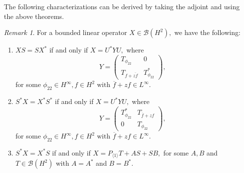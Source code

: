 \documentclass[12pt, reqno]{amsart}
\theoremstyle{definition}
\theoremstyle{remark}
\newtheorem{remark}[theorem]{Remark}
\numberwithin{equation}{section}
\begin{document}
            The following characterizations can be derived by taking the adjoint and using the above theorems.
            \begin{remark}
            For a bounded linear operator $X \in \mathcal{B}(H^2),$ we have the following:
            \begin{enumerate}
            \item $XS=SX^*$ if and only if $X=U^*YU,$
            where
            \begin{equation*}
            Y=
           \begin{pmatrix}
                 T_{\phi_{22}}&0\\
                 T_{f+\overline{zf}}&T^*_{\phi_{22}}
             \end{pmatrix},
             \end{equation*}
             for some $ \phi_{22}\in H^{\infty},  f \in H^2 \text{ with } {\overline{f}+zf} \in L^\infty.$ 
             \item $S^*X=X^*S^*$ if and only if $X=U^*YU,$ where
                \begin{equation*}
                    Y=
                    \begin{pmatrix}
                 T^*_{\phi_{22}}&T_{\overline{f}+zf}\\
                 0&T_{\phi_{22}}
             \end{pmatrix},
                \end{equation*}
           for some $ \phi_{22}\in H^{\infty}, f \in H^2 \text{ with } {\overline{f}+zf} \in L^\infty.$
           \item $S^*X=X^*S$ if and only if
                    $X= P_{\langle 1 \rangle }T+AS+SB,$ for some $A,B$ and $T \in \mathcal{B}(H^2)$ with $A=A^*$ and $B=B^*.$
            \end{enumerate}
        \end{remark}
        
\end{document}
